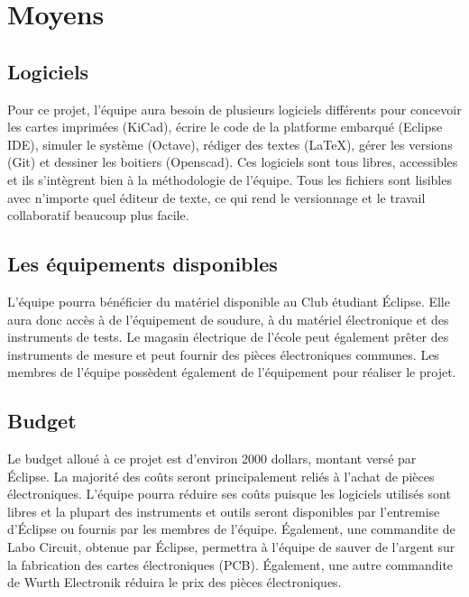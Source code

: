 \section{Moyens}

\subsection{Logiciels}
Pour ce projet, l'équipe aura besoin de plusieurs logiciels différents pour concevoir les cartes imprimées (KiCad), écrire le code de la platforme embarqué (Eclipse IDE), simuler le système (Octave), rédiger des textes (LaTeX), gérer les versions (Git) et dessiner les boitiers (Openscad). Ces logiciels sont tous libres, accessibles et ils s'intègrent bien à la méthodologie de l'équipe. Tous les fichiers sont lisibles avec n'importe quel éditeur de texte, ce qui rend le versionnage et le travail collaboratif beaucoup plus facile.\\

\subsection{Les équipements disponibles}
L'équipe pourra bénéficier du matériel disponible au Club étudiant Éclipse. Elle aura donc accès à de l'équipement de soudure, à du matériel électronique et des instruments de tests. Le magasin électrique de l'école peut également prêter des instruments de mesure et peut fournir des pièces électroniques communes. Les membres de l'équipe possèdent également de l'équipement pour réaliser le projet.

\subsection{Budget}
Le budget alloué à ce projet est d'environ 2000 dollars, montant versé par Éclipse. La majorité des coûts seront principalement reliés à l'achat de pièces électroniques. L'équipe pourra réduire ses coûts puisque les logiciels utilisés sont libres et la plupart des instruments et outils seront disponibles par l'entremise d'Éclipse ou fournis par les membres de l'équipe. Également, une commandite de Labo Circuit, obtenue par Éclipse, permettra à l'équipe de sauver de l'argent sur la fabrication des cartes électroniques (PCB). Également, une autre commandite de Wurth Electronik réduira le prix des pièces électroniques.

